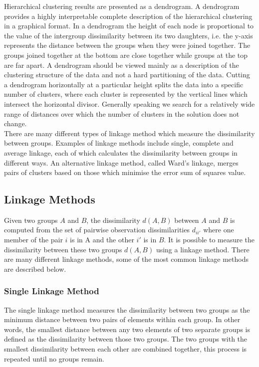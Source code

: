 \documentclass[]{article}
\begin{document}
\noindent Hierarchical clustering results are presented as a dendrogram. A dendrogram provides a highly interpretable complete description of the hierarchical clustering in a graphical format. In a dendrogram the height of each node is proportional to the value of the intergroup dissimilarity between its two daughters, i.e. the y-axis represents the distance between the groups when they were joined together. The groups joined together at the bottom are close together while groups at the top are far apart. A dendrogram should be viewed mainly as a description of the clustering structure of the data and not a hard partitioning of the data. Cutting a dendrogram horizontally at a particular height splits the data into a specific number of clusters, where each cluster is represented by the vertical lines which intersect the horizontal divisor. Generally speaking we search for a relatively wide range of distances over which the number of clusters in the solution does not change.\\

\noindent There are many different types of linkage method which measure the dissimilarity between groups. Examples of linkage methods include single, complete and average linkage, each of which calculates the dissimilarity between groups in different ways. An alternative linkage method, called Ward's linkage, merges pairs of clusters based on those which minimise the error sum of squares value.\\

\subsection{Linkage Methods}
Given two groups $A$ and $B$, the dissimilarity $d(A, B)$ between $A$ and $B$ is computed from the set of pairwise observation dissimilarities $d_{ii'}$ where one member of the pair $i$ is in A and the other $i'$ is in $B$. It is possible to measure the dissimilarity between these two groups $d(A, B)$ using a linkage method. There are many different linkage methods, some of the most common linkage methods are described below. 

\subsubsection{Single Linkage Method}
The single linkage method measures the dissimilarity between two groups as the minimum distance between two pairs of elements within each group. In other words, the smallest distance between any two elements of two separate groups is defined as the dissimilarity between those two groups. The two groups with the smallest dissimilarity between each other are combined together, this process is repeated until no groups remain. 
\end{document}
